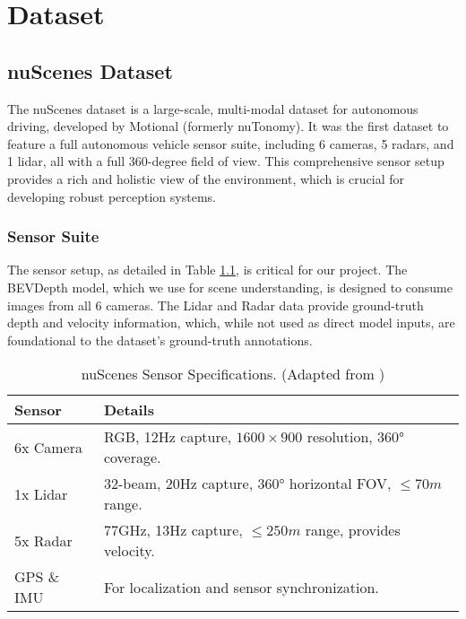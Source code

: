 
\chapter{Dataset} %

\label{Chapter2_Dataset} %


\section{nuScenes Dataset}

The nuScenes dataset \citep{caesar2020nuscenes} is a large-scale, multi-modal dataset for autonomous driving, developed by Motional (formerly nuTonomy). It was the first dataset to feature a full autonomous vehicle sensor suite, including 6 cameras, 5 radars, and 1 lidar, all with a full 360-degree field of view. This comprehensive sensor setup provides a rich and holistic view of the environment, which is crucial for developing robust perception systems.

\subsection{Sensor Suite}
The sensor setup, as detailed in Table \ref{tab:nuscenes_sensors}, is critical for our project. The BEVDepth model, which we use for scene understanding, is designed to consume images from all 6 cameras. The Lidar and Radar data provide ground-truth depth and velocity information, which, while not used as direct model inputs, are foundational to the dataset's ground-truth annotations.

\begin{table}[h]
\centering
\caption{nuScenes Sensor Specifications. (Adapted from \citep{caesar2020nuscenes})}
\label{tab:nuscenes_sensors}
\begin{tabular}{l p{9cm}}
\hline
\textbf{Sensor} & \textbf{Details} \\
\hline
6x Camera & RGB, 12Hz capture, $1600 \times 900$ resolution, 360° coverage. \\
1x Lidar & 32-beam, 20Hz capture, 360° horizontal FOV, $\le 70m$ range. \\
5x Radar & 77GHz, 13Hz capture, $\le 250m$ range, provides velocity. \\
GPS \& IMU & For localization and sensor synchronization. \\
\hline
\end{tabular}
\end{table}

